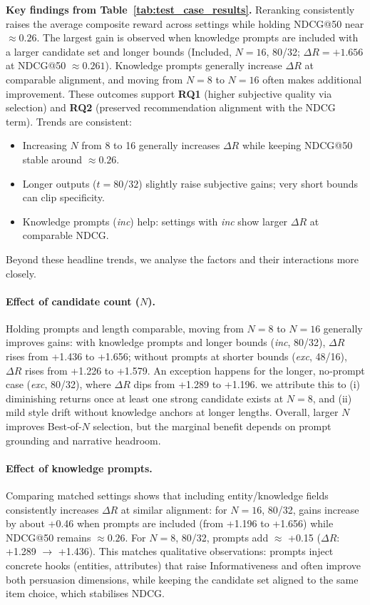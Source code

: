 \documentclass[12pt]{article}
\begin{document}
  \noindent\textbf{Key findings from Table~\ref{tab:test_case_results}.} Reranking consistently raises the average composite reward across settings while holding NDCG@50 near \(\approx 0.26\). The largest gain is observed when knowledge prompts are included with a larger candidate set and longer bounds (Included, $N=16$, 80/32; $\Delta R=+1.656$ at NDCG@50 \(\approx 0.261\)). Knowledge prompts generally increase \(\Delta R\) at comparable alignment, and moving from $N=8$ to $N=16$ often makes additional improvement. These outcomes support \textbf{RQ1} (higher subjective quality via selection) and \textbf{RQ2} (preserved recommendation alignment with the NDCG term).
  \newline
  \newline
  Trends are consistent:
  \begin{itemize}[leftmargin=*]
    \item Increasing $N$ from 8 to 16 generally increases \(\Delta R\) while keeping NDCG@50 stable around \(\approx 0.26\).
    \item Longer outputs ($t=80/32$) slightly raise subjective gains; very short bounds can clip specificity.
    \item Knowledge prompts (\textit{inc}) help: settings with \textit{inc} show larger \(\Delta R\) at comparable NDCG.
  \end{itemize}

  Beyond these headline trends, we analyse the factors and their interactions more closely.

  \paragraph{Effect of candidate count ($N$).} Holding prompts and length comparable, moving from $N=8$ to $N=16$ generally improves gains: with knowledge prompts and longer bounds (\textit{inc}, 80/32), \(\Delta R\) rises from +1.436 to +1.656; without prompts at shorter bounds (\textit{exc}, 48/16), \(\Delta R\) rises from +1.226 to +1.579. An exception happens for the longer, no‑prompt case (\textit{exc}, 80/32), where \(\Delta R\) dips from +1.289 to +1.196. we attribute this to (i) diminishing returns once at least one strong candidate exists at $N=8$, and (ii) mild style drift without knowledge anchors at longer lengths. Overall, larger $N$ improves Best‑of‑$N$ selection, but the marginal benefit depends on prompt grounding and narrative headroom.

  \paragraph{Effect of knowledge prompts.} Comparing matched settings shows that including entity/knowledge fields consistently increases \(\Delta R\) at similar alignment: for $N=16$, 80/32, gains increase by about +0.46 when prompts are included (from +1.196 to +1.656) while NDCG@50 remains \(\approx 0.26\). For $N=8$, 80/32, prompts add \(\approx\) +0.15 ($\Delta R$: +1.289 \(\to\) +1.436). This matches qualitative observations: prompts inject concrete hooks (entities, attributes) that raise Informativeness and often improve both persuasion dimensions, while keeping the candidate set aligned to the same item choice, which stabilises NDCG.
\end{document}
